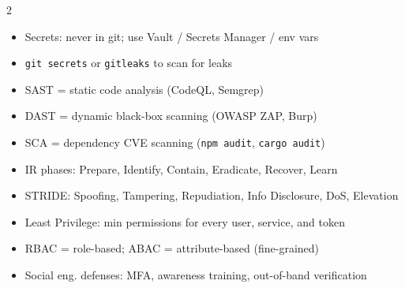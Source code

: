 \documentclass[11pt, letterpaper]{article}
\begin{document}
\begin{tcolorbox}[colback=part2bg, colframe=sectiongreen,
  title={\bfseries DevSecOps \& Operations}, arc=3pt, boxrule=1pt]
\footnotesize
\begin{multicols}{2}
\begin{itemize}[noitemsep, leftmargin=*]
  \item Secrets: never in git; use Vault / Secrets Manager / env vars
  \item \texttt{git secrets} or \texttt{gitleaks} to scan for leaks
  \item SAST = static code analysis (CodeQL, Semgrep)
  \item DAST = dynamic black-box scanning (OWASP ZAP, Burp)
  \item SCA = dependency CVE scanning (\texttt{npm audit}, \texttt{cargo audit})
\end{itemize}
\columnbreak
\begin{itemize}[noitemsep, leftmargin=*]
  \item IR phases: Prepare, Identify, Contain, Eradicate, Recover, Learn
  \item STRIDE: Spoofing, Tampering, Repudiation, Info Disclosure, DoS, Elevation
  \item Least Privilege: min permissions for every user, service, and token
  \item RBAC = role-based; ABAC = attribute-based (fine-grained)
  \item Social eng. defenses: MFA, awareness training, out-of-band verification
\end{itemize}
\end{multicols}
\end{tcolorbox}

\vspace{4pt}
\end{document}
